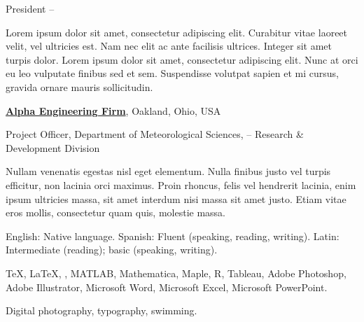\documentclass[letterpaper,MMMyyyy,nonstopmode]{./simple-resume-cv-master/simpleresumecv}
\begin{document}
\begin{Body}
\Gap
\BulletItem
	President
	\hfill
	 --
\begin{Detail}
	\SubBulletItem
		Lorem ipsum dolor sit amet, consectetur adipiscing elit.
	\SubBulletItem
		Curabitur vitae laoreet velit, vel ultricies est. Nam nec elit ac ante facilisis ultrices.
	\SubBulletItem
		Integer sit amet turpis dolor. Lorem ipsum dolor sit amet, consectetur adipiscing elit. Nunc at orci eu leo vulputate finibus sed et sem.
	\SubBulletItem
		Suspendisse volutpat sapien et mi cursus, gravida ornare mauris sollicitudin.
\end{Detail}


\Entry
\href{http://www.example.com/my-company}
{\textbf{Alpha Engineering Firm}},
Oakland, Ohio, USA

\Gap
\BulletItem
	Project Officer,
	Department of Meteorological Sciences,
	\hfill
	 --
	\newline
	Research \& Development Division
\begin{Detail}
	\SubBulletItem
		Nullam venenatis egestas nisl eget elementum.
	\SubBulletItem
		Nulla finibus justo vel turpis efficitur, non lacinia orci maximus. Proin rhoncus, felis vel hendrerit lacinia, enim ipsum ultricies massa, sit amet interdum nisi massa sit amet justo.
	\SubBulletItem
		Etiam vitae eros mollis, consectetur quam quis, molestie massa.
\end{Detail}

\BulletItem
	English: Native language.
\Gap
\BulletItem
	Spanish: Fluent (speaking, reading, writing).
\Gap
\BulletItem
	Latin: Intermediate (reading); basic (speaking, writing).

\Entry
	{\TeX}, {\LaTeX}, {\XeLaTeX},
	MATLAB,
	Mathematica,
	Maple,
	R,
	Tableau,
	Adobe Photoshop,
	Adobe Illustrator,
	Microsoft Word,
	Microsoft Excel,
	Microsoft PowerPoint.

\Entry
	Digital photography,
	typography,
	swimming.



\end{Body}
\end{document}
